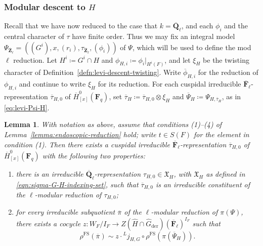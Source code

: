 \documentclass[reqno]{amsart}
\numberwithin{equation}{subsection}
\newcommand{\F}{\mathbf{F}}
\newcommand{\Q}{\mathbf{Q}}
\newcommand{\Z}{\mathbf{Z}}
\newcommand{\ol}[1]{\overline{#1}}
\newcommand{\wh}[1]{\widehat{#1}}
\newcommand{\co}{\colon}
\newcommand{\ld}{{}^L}
\DeclareMathOperator{\FS}{FS}
\DeclareMathOperator{\der}{der}
\newtheorem{lemma}[thm]{Lemma}
\theoremstyle{remark}
\numberwithin{equation}{subsection}
\numberwithin{figure}{subsection}
\begin{document}
\subsubsection{Modular descent to $H$}

Recall that we have now reduced to the case that $k = \ol\Q_\ell$, and each $\phi_i$ and the central character of $\tau$ have finite order. Thus we may fix an integral model $\Psi_{\ol\Z_\ell}=((G^i),x,(r_i),\tau_{\ol\Z_\ell},(\phi_i))$ of $\Psi$, which will be used to define the mod $\ell$ reduction. Let $H^i\coloneqq G^i\cap H$ and $\phi_{H,i}\coloneqq\phi_i|_{H^i(F)}$, and let $\xi_H$ be the twisting character of Definition~\ref{defn:levi-descent-twisting}. Write $\ol\phi_{H,i}$ for the reduction of $\phi_{H,i}$ and continue to write $\xi_H$ for its reduction. For each cuspidal irreducible $\ol\F_\ell$-representation $\ol\tau_{H,0}$ of $\ol H^0_{[x]}(\F_q)$, set $\ol\tau_H\coloneqq\ol\tau_{H,0}\otimes\xi_H$ and $\ol\Psi_H\coloneqq\Psi_{H,\ol\tau_H}$, as in \eqref{eq:levi-Psi-H}.

\begin{lemma}\label{lemma:tate-descent-to-H}
With notation as above, assume that conditions (1)--(4) of Lemma~\ref{lemma:endoscopic-reduction} hold; write $t \in S(F)$ for the element in condition (1). Then there exists a cuspidal irreducible $\ol\F_\ell$-representation $\ol\tau_{H,0}$ of $\ol H^0_{[x]}(\F_q)$ with the following two properties:
\begin{enumerate}
\item there is an irreducible $\ol\Q_\ell$-representation $\tau_{H,0} \in \mathfrak X_H$, with $\mathfrak X_H$ as defined in \eqref{eqn:sigma-G-H-indexing-set}, such that $\ol \tau_{H,0}$ is an irreducible constituent of the $\ell$-modular reduction of $\tau_{H,0}$;
\item for every irreducible subquotient $\ol\pi$ of the $\ell$-modular reduction of $\pi(\Psi)$, there exists a cocycle $z\co W_F/I_F \to Z(\wh H \cap \wh G_{\der})(\ol\F_\ell)^{I_F}$ such that
\[
\rho^{\FS}(\ol\pi) \sim z\cdot \ld j_{H,G} \circ \rho^{\FS}(\pi(\ol\Psi_H)).
\]
\end{enumerate}
\end{lemma}
\end{document}

